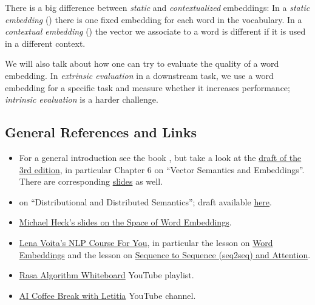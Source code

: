 \documentclass[11pt, a4paper]{amsart}
\begin{document}
There is a big difference between \emph{static} and \emph{contextualized} embeddings:
In a \emph{static embedding} () there is one fixed embedding for each word in the vocabulary.
In a \emph{contextual embedding} () the vector we associate to a word is different if it is used in a different context.

We will also talk about how one can try to evaluate the quality of a word embedding.
In \emph{extrinsic evaluation} in a downstream task, we use a word embedding for a specific task and measure whether it increases performance; \emph{intrinsic evaluation} is a harder challenge.

\subsection{General References and Links}
\label{sec:general_references}

\begin{itemize}
    \item For a general introduction see the book \cite{jurafsky2009speech}, but take a look at the \href{https://web.stanford.edu/~jurafsky/slp3/}{draft of the 3rd edition}, in particular Chapter 6 on ``Vector Semantics and Embeddings''.
    There are corresponding \href{https://web.stanford.edu/~jurafsky/slp3/slides/6_Vector_Apr18_2021.pdf}{slides} as well.

    \item \cite[Chp.~14]{eisenstein2019introduction} on ``Distributional and Distributed Semantics'';
    draft available \href{https://github.com/jacobeisenstein/gt-nlp-class/blob/master/notes/eisenstein-nlp-notes.pdf}{here}.

    \item \href{https://www.cs.hhu.de/fileadmin/redaktion/Fakultaeten/Mathematisch-Naturwissenschaftliche_Fakultaet/Informatik/Dialog_Systems_and_Machine_Learning/20190705_word_embeddings.pdf}{Michael Heck's slides on the Space of Word Embeddings}.
    
    \item \href{https://lena-voita.github.io/nlp_course}{Lena Voita's NLP Course For You}, in particular the lesson on \href{https://lena-voita.github.io/nlp_course/word_embeddings}{Word Embeddings} and the lesson on \href{https://lena-voita.github.io/nlp_course/seq2seq_and_attention.html}{Sequence to Sequence (seq2seq) and Attention}.
    
    \item \href{https://youtube.com/playlist?list=PL75e0qA87dlG-za8eLI6t0_Pbxafk-cxb}{Rasa Algorithm Whiteboard} YouTube playlist.
    
    \item \href{https://www.youtube.com/c/aicoffeebreak}{AI Coffee Break with Letitia} YouTube channel.
\end{itemize}
\end{document}
